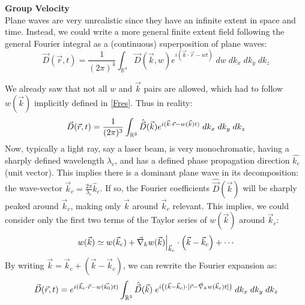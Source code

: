 \documentclass[11pt, a4paper, twoside]{article} %
\newcommand{\R}{\mathbb{R}} %
\DeclareRobustCommand{\mybox}[2][gray!10]{%
\begin{tcolorbox}[   %
        left=0.2cm,
        right=0.2cm,
        top=0.15cm,
        bottom=0.15cm,
        colback=#1,
        colframe=#1,
        width=\dimexpr\textwidth\relax, 
        enlarge left by=0mm,
        boxsep=5pt,
        arc=0pt,outer arc=0pt,
        ]
        #2
\end{tcolorbox}
}
\begin{document}
\mybox{{\bf Group Velocity\vspace{0.2cm}}\\
Plane waves are very unrealistic since they have an infinite extent in space and time. Instead, we could write a more general finite extent field following the general Fourier integral as a (continuous) superposition of plane waves:\vspace{-0.2cm}
\begin{equation}
\vec{D}(\vec{r},t)= \frac{1}{(2\pi)^4}\int_{\R^4}\vec{D}(\vec{k},w)e^{i(\vec{k}\cdot\vec{r}-wt)}\; dw\;dk_x\;dk_y\;dk_z
\end{equation}}
\mybox{
We already saw that not all $w$ and $\vec{k}$ pairs are allowed, which had to follow $w(\vec{k})$ implicitly defined in \eqref{Fres}. Thus in reality:\vspace{-0.2cm}
\begin{equation}
\vec{D}(\vec{r},t)= \frac{1}{(2\pi)^3}\int_{\R^3}\hat{\vec{D}}(\vec{k})e^{i(\vec{k}\cdot\vec{r}-w(\vec{k})t)} \;dk_x\;dk_y\;dk_z\vspace{-0.2cm}
\end{equation}
Now, typically a light ray, say a laser beam, is very monochromatic, having a sharply defined wavelength $\lambda_c$, and has a defined phase propagation direction $\hat{k_c}$ (unit vector). This implies there is a dominant plane wave in its decomposition: the wave-vector $\vec{k}_c=\frac{2\pi}{\lambda_c}\hat{k}_c$. If so, the Fourier coefficients $\hat{\vec{D}}(\vec{k})$ will be sharply peaked around $\vec{k}_c$, making only $\vec{k}$ around $\vec{k}_c$ relevant. This implies, we could consider only the first two terms of the Taylor series of $w(\vec{k})$ around $\vec{k}_c$:\vspace{-0.2cm}
\begin{equation}
w(\vec{k})\simeq w(\vec{k}_c)+\vec{\nabla}_kw(\vec{k})\Big\rvert_{\vec{k}_c}\cdot\qty(\vec{k}-\vec{k}_c)+\cdots\vspace{-0.2cm}
\end{equation}
By writing $\vec{k}=\vec{k}_c+(\vec{k}-\vec{k}_c)$, we can rewrite the Fourier expansion as:\vspace{-0.1cm}
\begin{equation}
\vec{D}(\vec{r},t)=e^{i(\vec{k}_c\cdot\vec{r}-w(\vec{k_0})t)}\int_{\R^3}\hat{\vec{D}}(\vec{k})\;e^{i\qty((\vec{k}-\vec{k}_c)\cdot [\vec{r}-\vec{\nabla}_kw(\vec{k}_c)t])}\;dk_x\;dk_y\;dk_z\vspace{-0.2cm}
\end{equation}
}
\end{document}
